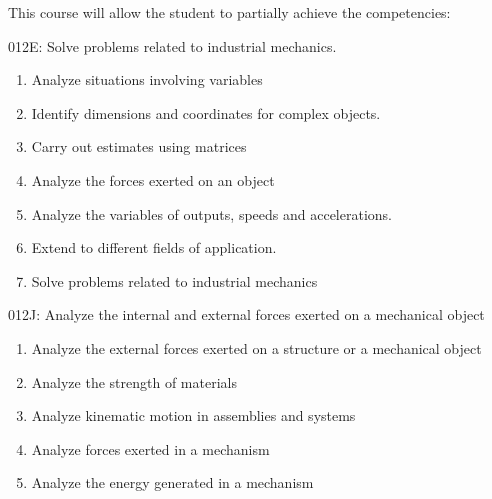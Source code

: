 {This course will allow the student to partially achieve the competencies:

012E: Solve problems related to industrial mechanics.
\begin{enumerate}
\item Analyze situations involving variables
\item Identify dimensions and coordinates for complex objects.
\item Carry out estimates using matrices
\item Analyze the forces exerted on an object
\item Analyze the variables of outputs, speeds and accelerations.
\item Extend to different fields of application.
\item Solve problems related to industrial mechanics
\end{enumerate}
\smallskip 
012J: Analyze the internal and external forces exerted on a mechanical object
\begin{enumerate}
	\item Analyze the external forces exerted on a structure or a mechanical object
	\item Analyze the strength of materials
	\item Analyze kinematic motion in assemblies and systems
	\item Analyze forces exerted in a mechanism
	\item Analyze the energy generated in a mechanism
\end{enumerate}
}
